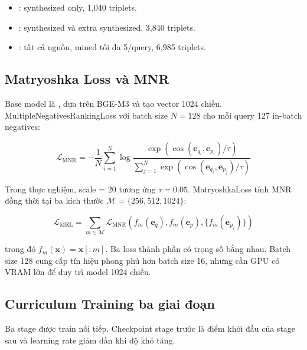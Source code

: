 \documentclass[../DoAn.tex]{subfiles}
\begin{document}
\begin{itemize}
    \item {}: synthesized only, 1,040 triplets.
    \item {}: synthesized và extra synthesized, 3,840 triplets.
    \item {}: tất cả nguồn, mined tối đa 5/query, 6,985 triplets.
\end{itemize}

\subsection{Matryoshka Loss và MNR}
\label{subsection:4.3.2}

Base model là , dựa trên BGE-M3 và tạo vector 1024 chiều. MultipleNegativesRankingLoss với batch size $N=128$ cho mỗi query 127 in-batch negatives:

\[
\mathcal{L}_{\text{MNR}}
=
-\frac{1}{N}
\sum_{i=1}^{N}
\log
\frac{
\exp\left(\cos(\mathbf{e}_{q_i},\mathbf{e}_{p_i})/\tau\right)
}{
\sum_{j=1}^{N}
\exp\left(\cos(\mathbf{e}_{q_i},\mathbf{e}_{p_j})/\tau\right)
}
\]

Trong thực nghiệm, scale = 20 tương ứng $\tau=0.05$. MatryoshkaLoss tính MNR đồng thời tại ba kích thước $\mathcal{M}=\{256,512,1024\}$:

\[
\mathcal{L}_{\text{MRL}}
=
\sum_{m\in\mathcal{M}}
\mathcal{L}_{\text{MNR}}
\left(
f_m(\mathbf{e}_q),
f_m(\mathbf{e}_p),
\{f_m(\mathbf{e}_{p_j})\}
\right)
\]

trong đó $f_m(\mathbf{x})=\mathbf{x}[:m]$. Ba loss thành phần có trọng số bằng nhau. Batch size 128 cung cấp tín hiệu phong phú hơn batch size 16, nhưng cần GPU có VRAM lớn để duy trì model 1024 chiều.

\subsection{Curriculum Training ba giai đoạn}
\label{subsection:4.3.3}

Ba stage được train nối tiếp. Checkpoint stage trước là điểm khởi đầu của stage sau và learning rate giảm dần khi độ khó tăng.
\end{document}

